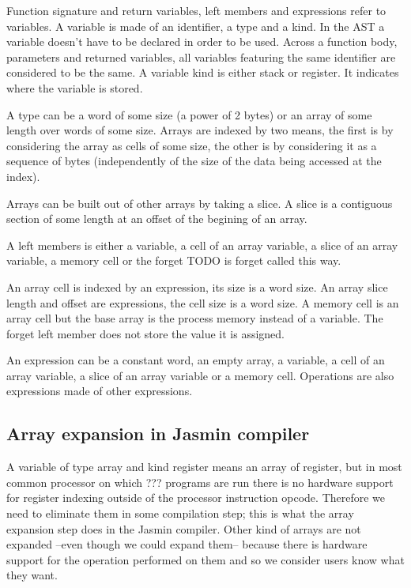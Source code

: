 \documentclass{article}
\begin{document}
Function signature and return variables, left members and expressions refer to
variables. A variable is made of an identifier, a type and a kind. In the AST a
variable doesn't have to be declared in order to be used. Across a function
body, parameters and returned variables, all variables featuring the same
identifier are considered to be the same. A variable kind is either stack or
register. It indicates where the variable is stored.

\smallskip

A type can be a word of some size (a power of 2 bytes) or an array of some
length over words of some size. Arrays are indexed by two means, the first is
by considering the array as cells of some size, the other is by considering it
as a sequence of bytes (independently of the size of the data being accessed at
the index).

Arrays can be built out of other arrays by taking a slice. A slice is a
contiguous section of some length at an offset of the begining of an array.

\smallskip

A left members is either a variable, a cell of an array variable, a slice of an
array variable, a memory cell or the forget TODO is forget called this way.

An array cell is indexed by an expression, its size is a word size. An array
slice length and offset are expressions, the cell size is a word size. A memory
cell is an array cell but the base array is the process memory instead of a
variable. The forget left member does not store the value it is assigned.

An expression can be a constant word, an empty array, a variable, a cell of an
array variable, a slice of an array variable or a memory cell. Operations are
also expressions made of other expressions.

\subsection{Array expansion in Jasmin compiler}

A variable of type array and kind register means an array of register, but in
most common processor on which ??? programs are run there is no hardware support
for register indexing outside of the processor instruction opcode. Therefore we
need to eliminate them in some compilation step; this is what the array
expansion step does in the Jasmin compiler. Other kind of arrays are not
expanded --even though we could expand them-- because there is hardware support
for the operation performed on them and so we consider users know what they want.
\end{document}
